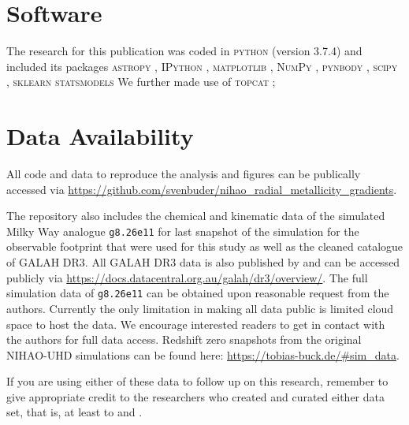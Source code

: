 \documentclass[fleqn,usenatbib]{mnras}
\begin{document}
\section*{Software}

The research for this publication was coded in \textsc{python} (version 3.7.4) and included its packages
\textsc{astropy} \citep[v. 3.2.2;][]{Robitaille2013,PriceWhelan2018},
\textsc{IPython} \citep[v. 7.8.0;][]{ipython},
\textsc{matplotlib} \citep[v. 3.1.3;][]{matplotlib},
\textsc{NumPy} \citep[v. 1.17.2;][]{numpy},
\textsc{pynbody} \citep[v. 1.1.0;][]{pynbody},
\textsc{scipy} \citep[v. 1.3.1;][]{Scipy},
\textsc{sklearn} \citep[v. 1.5.1][]{scikit-learn}
\textsc{statsmodels} \citep[v. 0.14.2][]{statsmodels}
We further made use of \textsc{topcat} \citep[version 4.7;][]{Taylor2005};

\section*{Data Availability}

All code and data to reproduce the analysis and figures can be publically accessed via \url{https://github.com/svenbuder/nihao_radial_metallicity_gradients}.

The repository also includes the chemical and kinematic data of the simulated Milky Way analogue \texttt{g8.26e11} for last snapshot of the simulation for the observable footprint that were used for this study as well as the cleaned catalogue of GALAH DR3. All GALAH DR3 data is also published by \citet{Buder2021} and can be accessed publicly via \url{https://docs.datacentral.org.au/galah/dr3/overview/}. The full simulation data of \texttt{g8.26e11} can be obtained upon reasonable request from the authors. Currently the only limitation in making all data public is limited cloud space to host the data. We encourage interested readers to get in contact with the authors for full data access. Redshift zero snapshots from the original NIHAO-UHD simulations can be found here: \url{https://tobias-buck.de/\#sim_data}.

If you are using either of these data to follow up on this research, remember to give appropriate credit to the researchers who created and curated either data set, that is, at least to \citet{Buder2021, Buder2022} and \citet{Buck2020b, Buck2021}.



\end{document}
